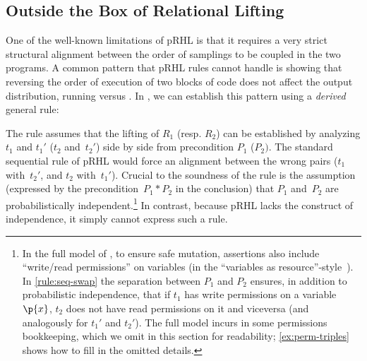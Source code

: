 \subsection{Outside the Box of Relational Lifting}
\label{sec:overview:obox}




One of the well-known limitations of pRHL is that it requires
a very strict structural alignment between the order of samplings
to be coupled in the two programs.
A common pattern that pRHL rules cannot handle is
showing that reversing the order of execution of two blocks of code
does not affect the output distribution,
\eg running
   versus
  .
In \thelogic, we can establish this pattern using a \emph{derived} general rule:
\begin{proofrule}
  \label{rule:seq-swap}
\end{proofrule}
The rule assumes that the lifting of $R_1$ (resp. $R_2$) can be established
by analyzing $t_1$ and $t_1'$ ($t_2$ and~$t_2'$)
side by side from precondition $P_1$ ($P_2)$.
The standard sequential rule of pRHL would force an alignment
between the wrong pairs ($t_1$ with~$t_2'$, and $t_2$ with~$t_1'$).
Crucial to the soundness of the rule is the assumption
(expressed by the precondition~$P_1*P_2$ in the conclusion)
that $P_1$ and~$P_2$ are probabilistically independent.\footnote{
  In the full model of \thelogic,
  to ensure safe mutation, assertions also include ``write/read permissions''
  on variables (in the ``variables as resource''-style~\cite{BornatCY06}).
  In \ref{rule:seq-swap} the separation between $P_1$ and $P_2$ ensures,
  in addition to probabilistic independence, that if $t_1$ has write permissions
  on a variable~$\p{x}$, $t_2$ does not have read permissions on it and viceversa (and analogously for $t_1'$ and $t_2'$).
  The full model incurs in some permissions bookkeeping,
  which we omit in this section for readability;
  \cref{ex:perm-triples} shows how to fill in the omitted details.}
In contrast, because pRHL lacks the construct of independence,
it simply cannot express such a rule.

